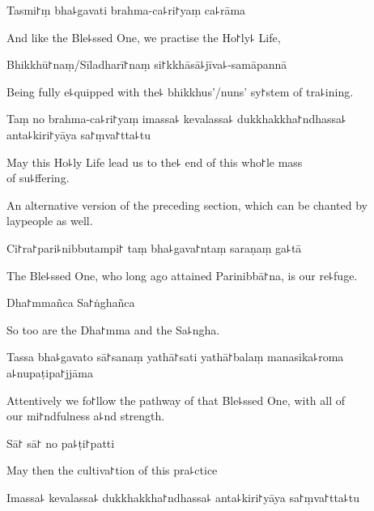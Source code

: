Tasmi꜓ṃ bha꜕gavati brahma-ca꜕ri꜓yaṃ ca꜕rāma

\begin{english}
  And like the Ble꜕ssed One, we practise the Ho꜓ly꜕ Life,
\end{english}

Bhikkhū꜓naṃ/Sīladharī꜓naṃ si꜓kkhāsā꜕jīva꜕-samāpannā

\begin{english}
  Being fully e꜕quipped with the꜕ bhikkhus'/nuns' sy꜓stem of tra꜕ining.
\end{english}

Taṃ no brahma-ca꜕ri꜓yaṃ imassa꜕ kevalassa꜕ dukkhakkha꜓ndhassa꜕ anta꜕kiri꜓yāya sa꜓ṃva꜓tta꜕tu

\begin{english}
  May this Ho꜕ly Life lead us to the꜕ end of this who꜓le mass \\of su꜕ffering.
\end{english}

\begin{instruction}
  An alternative version of the preceding section, which can be chanted by laypeople as well.
\end{instruction}

Ci꜓ra꜓pari꜕nibbutampi꜓ taṃ bha꜕gava꜓ntaṃ saraṇaṃ ga꜕tā

\begin{english}
  The Ble꜕ssed One, who long ago attained Parinibbā꜓na, is our re꜕fuge.
\end{english}

Dha꜓mmañca Sa꜓ṅghañca

\begin{english}
  So too are the Dha꜓mma and the Sa꜕ngha.
\end{english}

Tassa bha꜕gavato sā꜓sanaṃ yathā꜓sati yathā꜓balaṃ manasika꜕roma a꜕nupaṭipa꜓jjāma

\begin{english}
  Attentively we fo꜓llow the pathway of that Ble꜕ssed One, with all of \\our mi꜓ndfulness a꜕nd strength.
\end{english}

Sā꜓ sā꜓ no pa꜕ṭi꜓patti

\begin{english}
  May then the cultiva꜓tion of this pra꜕ctice
\end{english}

Imassa꜕ kevalassa꜕ dukkhakkha꜓ndhassa꜕ anta꜕kiri꜓yāya sa꜓ṃva꜓tta꜕tu

